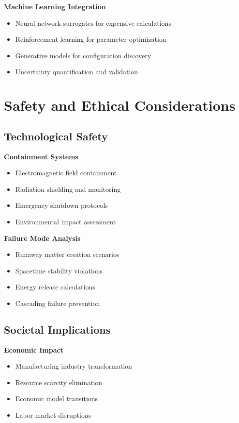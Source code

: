 \documentclass[11pt]{article}
\begin{document}
\textbf{Machine Learning Integration}
\begin{itemize}
\item Neural network surrogates for expensive calculations
\item Reinforcement learning for parameter optimization
\item Generative models for configuration discovery
\item Uncertainty quantification and validation
\end{itemize}

\section{Safety and Ethical Considerations}

\subsection{Technological Safety}

\textbf{Containment Systems}
\begin{itemize}
\item Electromagnetic field containment
\item Radiation shielding and monitoring
\item Emergency shutdown protocols
\item Environmental impact assessment
\end{itemize}

\textbf{Failure Mode Analysis}
\begin{itemize}
\item Runaway matter creation scenarios
\item Spacetime stability violations
\item Energy release calculations
\item Cascading failure prevention
\end{itemize}

\subsection{Societal Implications}

\textbf{Economic Impact}
\begin{itemize}
\item Manufacturing industry transformation
\item Resource scarcity elimination
\item Economic model transitions
\item Labor market disruptions
\end{itemize}
\end{document}
